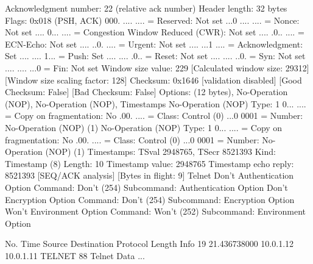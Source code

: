     Acknowledgment number: 22    (relative ack number)
    Header length: 32 bytes
    Flags: 0x018 (PSH, ACK)
        000. .... .... = Reserved: Not set
        ...0 .... .... = Nonce: Not set
        .... 0... .... = Congestion Window Reduced (CWR): Not set
        .... .0.. .... = ECN-Echo: Not set
        .... ..0. .... = Urgent: Not set
        .... ...1 .... = Acknowledgment: Set
        .... .... 1... = Push: Set
        .... .... .0.. = Reset: Not set
        .... .... ..0. = Syn: Not set
        .... .... ...0 = Fin: Not set
    Window size value: 229
    [Calculated window size: 29312]
    [Window size scaling factor: 128]
    Checksum: 0x1646 [validation disabled]
        [Good Checksum: False]
        [Bad Checksum: False]
    Options: (12 bytes), No-Operation (NOP), No-Operation (NOP), Timestamps
        No-Operation (NOP)
            Type: 1
                0... .... = Copy on fragmentation: No
                .00. .... = Class: Control (0)
                ...0 0001 = Number: No-Operation (NOP) (1)
        No-Operation (NOP)
            Type: 1
                0... .... = Copy on fragmentation: No
                .00. .... = Class: Control (0)
                ...0 0001 = Number: No-Operation (NOP) (1)
        Timestamps: TSval 2948765, TSecr 8521393
            Kind: Timestamp (8)
            Length: 10
            Timestamp value: 2948765
            Timestamp echo reply: 8521393
    [SEQ/ACK analysis]
        [Bytes in flight: 9]
Telnet
    Don't Authentication Option
        Command: Don't (254)
        Subcommand: Authentication Option
    Don't Encryption Option
        Command: Don't (254)
        Subcommand: Encryption Option
    Won't Environment Option
        Command: Won't (252)
        Subcommand: Environment Option

No.     Time           Source                Destination           Protocol Length Info
     19 21.436738000   10.0.1.12             10.0.1.11             TELNET   88     Telnet Data ...

